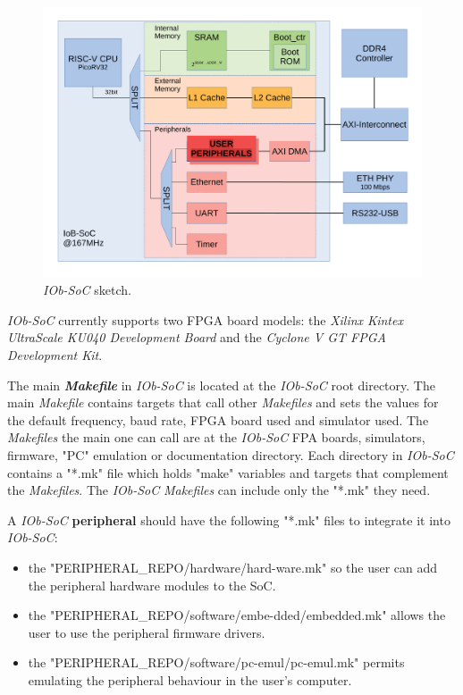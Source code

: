 \begin{figure}[!ht]
  \centering
  \includegraphics[width=\linewidth]{../images/bd_original.pdf}
  \caption{\textit{IOb-SoC} sketch.}
  \label{fig:bd_original}
\end{figure}

\textit{IOb-SoC} currently supports two FPGA board models: the \textit{Xilinx Kintex UltraScale KU040 Development Board} and the \textit{Cyclone V GT FPGA Development Kit}.

The main \textbf{\textit{Makefile}} in \textit{IOb-SoC} is located at the \textit{IOb-SoC} root directory. The main \textit{Makefile} contains targets that call other \textit{Makefiles} and sets the values for the default frequency, baud rate, FPGA board used and simulator used. The \textit{Makefiles} the main one can call are at the \textit{IOb-SoC} FPA boards, simulators, firmware, "PC" emulation or documentation directory. Each directory in \textit{IOb-SoC} contains a "*.mk" file which holds "make" variables and targets that complement the \textit{Makefiles}. The \textit{IOb-SoC} \textit{Makefiles} can include only the "*.mk" they need.

A \textit{IOb-SoC} \textbf{peripheral} should have the following "*.mk" files to integrate it into \textit{IOb-SoC}:
\begin{itemize}
    \item the "PERIPHERAL\_REPO/hardware/hard-ware.mk" so the user can add the peripheral hardware modules to the SoC.
    \item the "PERIPHERAL\_REPO/software/embe-dded/embedded.mk" allows the user to use the peripheral firmware drivers.
    \item the "PERIPHERAL\_REPO/software/pc-emul/pc-emul.mk" permits emulating the peripheral behaviour in the user's computer.
\end{itemize}

